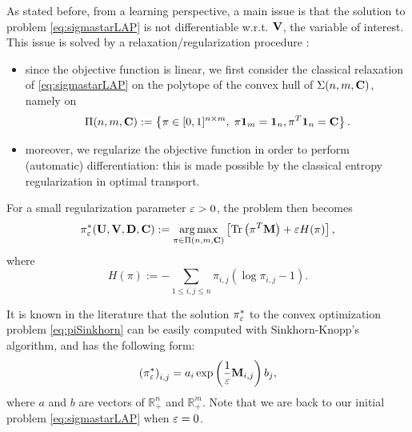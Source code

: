 As stated before, from a learning perspective, a main issue is that the solution
to problem \eqref{eq:sigmastarLAP} is not differentiable w.r.t. $\mathbf{V}$, the
variable of interest. This issue is solved by a relaxation/regularization
procedure \cite{cuturi_sinkhorn_2013}:
\begin{itemize}
    \item since the objective function is linear, we first consider the
          classical relaxation of \eqref{eq:sigmastarLAP} on the polytope of the
          convex hull of $\Sigma(n,m,\mathbf{C})$, namely on
          \begin{equation*}\label{eq:defPi}
              \Pi(n,m,\mathbf{C}) := \left\lbrace \pi \in [0,1]^{n \times m}, \; {\pi \mathbf{1}_m}  = { \mathbf{1}_n}, {\pi^T \mathbf{1}_n} = \mathbf{C} \right\rbrace.
          \end{equation*}
    \item moreover, we regularize the objective function in order to perform
          (automatic) differentiation: this is made possible by the classical entropy
          regularization in optimal transport.
\end{itemize}
For a small regularization parameter $\varepsilon>0$, the problem then becomes
\begin{equation}\label{eq:piSinkhorn}
    \pi_{\varepsilon}^*(\mathbf{U},\mathbf{V},\mathbf{D},\mathbf{C}) := \operatorname*{arg\,max}_{\pi \in \Pi(n,m,\mathbf{C})} \left[{\rm Tr}\left( \pi^T \mathbf{M} \right) + \varepsilon H(\pi) \right],
\end{equation} where
\begin{equation}\label{eq:Hpi}
    H(\pi) := - \sum_{1 \leq i,j \leq n} \pi_{i,j} (\log \pi_{i,j}-1).
\end{equation}

It is known in the literature \cite{cuturi_sinkhorn_2013} that the solution
$\pi_{\varepsilon}^*$ to the convex optimization problem \eqref{eq:piSinkhorn} can be
easily computed with Sinkhorn-Knopp's algorithm, and has the following form:
\begin{equation}\label{eq:formesinkhorn}
    \left(\pi_{\varepsilon}^* \right)_{i,j} = a_i \exp\left( \frac{1}{\varepsilon} \mathbf{M}_{i,j} \right) b_j,
\end{equation} where $a$ and $b$ are vectors of $\mathbb{R}_+^n$ and $\mathbb{R}_+^m$.
Note that we are back to our initial problem \eqref{eq:sigmastarLAP} when
$\varepsilon=0$.

